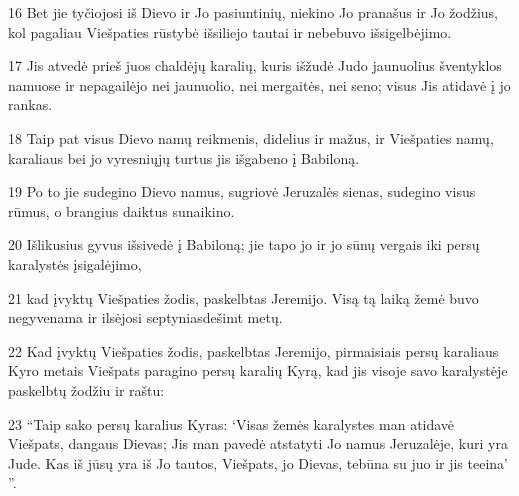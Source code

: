 \par 16 Bet jie tyčiojosi iš Dievo ir Jo pasiuntinių, niekino Jo pranašus ir Jo žodžius, kol pagaliau Viešpaties rūstybė išsiliejo tautai ir nebebuvo išsigelbėjimo. 
\par 17 Jis atvedė prieš juos chaldėjų karalių, kuris išžudė Judo jaunuolius šventyklos namuose ir nepagailėjo nei jaunuolio, nei mergaitės, nei seno; visus Jis atidavė į jo rankas. 
\par 18 Taip pat visus Dievo namų reikmenis, didelius ir mažus, ir Viešpaties namų, karaliaus bei jo vyresniųjų turtus jis išgabeno į Babiloną. 
\par 19 Po to jie sudegino Dievo namus, sugriovė Jeruzalės sienas, sudegino visus rūmus, o brangius daiktus sunaikino. 
\par 20 Išlikusius gyvus išsivedė į Babiloną; jie tapo jo ir jo sūnų vergais iki persų karalystės įsigalėjimo, 
\par 21 kad įvyktų Viešpaties žodis, paskelbtas Jeremijo. Visą tą laiką žemė buvo negyvenama ir ilsėjosi septyniasdešimt metų. 
\par 22 Kad įvyktų Viešpaties žodis, paskelbtas Jeremijo, pirmaisiais persų karaliaus Kyro metais Viešpats paragino persų karalių Kyrą, kad jis visoje savo karalystėje paskelbtų žodžiu ir raštu: 
\par 23 “Taip sako persų karalius Kyras: ‘Visas žemės karalystes man atidavė Viešpats, dangaus Dievas; Jis man pavedė atstatyti Jo namus Jeruzalėje, kuri yra Jude. Kas iš jūsų yra iš Jo tautos, Viešpats, jo Dievas, tebūna su juo ir jis teeina’ ”.



